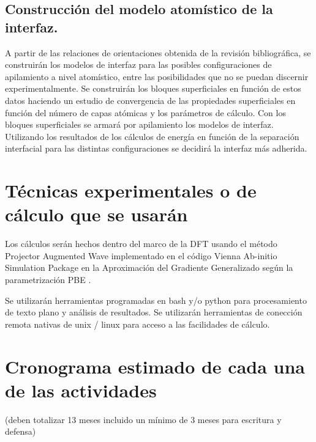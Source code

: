 \subsection{ Construcción del modelo atomístico de la interfaz.}

A partir de las relaciones de orientaciones obtenida de la revisión 
bibliográfica, se construirán los modelos de interfaz para las posibles 
configuraciones de apilamiento a nivel atomístico, entre las posibilidades que 
no se puedan discernir experimentalmente. Se construirán los bloques 
superficiales en función de estos datos haciendo un estudio de convergencia de 
las propiedades superficiales en función del número de capas atómicas y los 
parámetros de cálculo. Con los bloques superficiales se armará por apilamiento 
los modelos de interfaz. Utilizando los resultados de los cálculos de energía 
en función de la separación interfacial para las distintas configuraciones 
\cite{Jiangetal} 
se decidirá la interfaz más adherida.

\section{Técnicas experimentales o de cálculo que se usarán}

Los cálculos serán hechos dentro del marco de la DFT \cite{KohnSham65,
HohenbergKohn64} usando el método 
Projector Augmented Wave\cite{Bloch1994,Kresse1999}
implementado en el código Vienna Ab-initio 
Simulation Package\cite{Hafner2007,Hafner2008}
en la Aproximación del Gradiente Generalizado según la 
parametrización PBE \cite{PBE}. 

Se utilizarán herramientas programadas en bash y/o python para procesamiento de 
texto plano y análisis de resultados. Se utilizarán herramientas de conección 
remota nativas de unix / linux para acceso a las facilidades de cálculo.

\section{Cronograma estimado de cada una de las actividades}

 (deben totalizar 13 
meses incluido un mínimo de 3 meses para escritura y defensa) 

